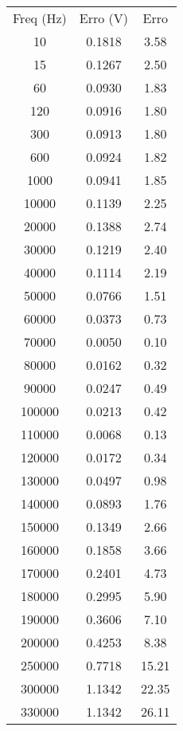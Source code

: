 \documentclass[12pt,twoside, a4paper, twocolumn]{article}
\begin{document}
\begin{center}
    \begin{tabular}{ |c|c|c| }
        \hline
        Freq (Hz) & Erro (V) & Erro  \\
        10        & 0.1818   & 3.58  \\
        15        & 0.1267   & 2.50  \\
        60        & 0.0930   & 1.83  \\
        120       & 0.0916   & 1.80  \\
        300       & 0.0913   & 1.80  \\
        600       & 0.0924   & 1.82  \\
        1000      & 0.0941   & 1.85  \\
        10000     & 0.1139   & 2.25  \\
        20000     & 0.1388   & 2.74  \\
        30000     & 0.1219   & 2.40  \\
        40000     & 0.1114   & 2.19  \\
        50000     & 0.0766   & 1.51  \\
        60000     & 0.0373   & 0.73  \\
        70000     & 0.0050   & 0.10  \\
        80000     & 0.0162   & 0.32  \\
        90000     & 0.0247   & 0.49  \\
        100000    & 0.0213   & 0.42  \\
        110000    & 0.0068   & 0.13  \\
        120000    & 0.0172   & 0.34  \\
        130000    & 0.0497   & 0.98  \\
        140000    & 0.0893   & 1.76  \\
        150000    & 0.1349   & 2.66  \\
        160000    & 0.1858   & 3.66  \\
        170000    & 0.2401   & 4.73  \\
        180000    & 0.2995   & 5.90  \\
        190000    & 0.3606   & 7.10  \\
        200000    & 0.4253   & 8.38  \\
        250000    & 0.7718   & 15.21 \\
        300000    & 1.1342   & 22.35 \\
        330000    & 1.1342   & 26.11 \\
        \hline
    \end{tabular}
\end{center}
\end{document}
